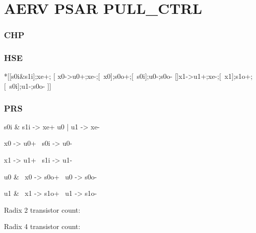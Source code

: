 \documentclass{article}
\begin{document}
\section{AERV PSAR PULL\_CTRL}

\subsubsection*{CHP}

\subsubsection*{HSE}

\begin{hse}
*[[s0i&s1i];xe+;
  [ x0->u0+;xe-;[~x0];s0o+;[~s0i];u0-;s0o-
  []x1->u1+;xe-;[~x1];s1o+;[~s0i];u1-;s0o-
  ]]
\end{hse}

\subsubsection*{PRS}

\begin{prs2}
s0i & s1i -> xe+
u0 | u1 -> xe-
\end{prs2}

\begin{prs2}
x0 -> u0+
~s0i -> u0-

x1 -> u1+
~s1i -> u1-
\end{prs2}

\begin{prs2}
u0 & ~x0 -> s0o+
~u0 -> s0o-

u1 & ~x1 -> s1o+
~u1 -> s1o-
\end{prs2}

Radix 2 transistor count: 

Radix 4 transistor count: 

\end{document}

